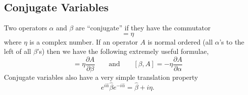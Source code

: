 \subsection{Conjugate Variables}

Two operators $\alpha$ and $\beta$ are ``conjugate'' if they have the commutator \begin{equation}
[\alpha,\beta]=\eta \end{equation}
where $\eta$ is a complex number. If an operator $A$ is normal ordered (all $\alpha$'s to the left of all $\beta$'s) then we have the following extremely useful formulae, \begin{equation}
[\alpha,A] = \eta\frac{\partial A}{\partial\beta}\qquad\textrm{and}\qquad[\beta,A]=-\eta\frac{\partial A}{\partial\alpha} \end{equation}
Conjugate variables also have a very simple translation property \begin{equation}
e^{i\hat{\alpha}}\hat{\beta}e^{-i\hat{\alpha}}=\hat{\beta}+i\eta. \end{equation}
